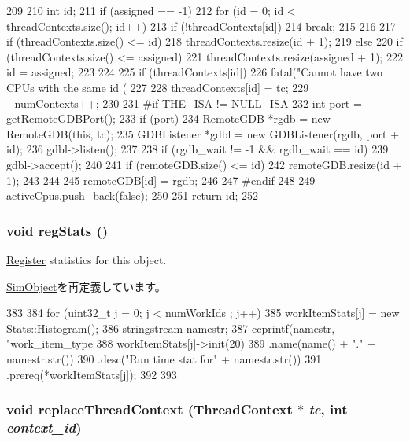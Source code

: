 \begin{DoxyCode}
209 {
210     int id;
211     if (assigned == -1) {
212         for (id = 0; id < threadContexts.size(); id++) {
213             if (!threadContexts[id])
214                 break;
215         }
216 
217         if (threadContexts.size() <= id)
218             threadContexts.resize(id + 1);
219     } else {
220         if (threadContexts.size() <= assigned)
221             threadContexts.resize(assigned + 1);
222         id = assigned;
223     }
224 
225     if (threadContexts[id])
226         fatal("Cannot have two CPUs with the same id (%
227 
228     threadContexts[id] = tc;
229     _numContexts++;
230 
231 #if THE_ISA != NULL_ISA
232     int port = getRemoteGDBPort();
233     if (port) {
234         RemoteGDB *rgdb = new RemoteGDB(this, tc);
235         GDBListener *gdbl = new GDBListener(rgdb, port + id);
236         gdbl->listen();
237 
238         if (rgdb_wait != -1 && rgdb_wait == id)
239             gdbl->accept();
240 
241         if (remoteGDB.size() <= id) {
242             remoteGDB.resize(id + 1);
243         }
244 
245         remoteGDB[id] = rgdb;
246     }
247 #endif
248 
249     activeCpus.push_back(false);
250 
251     return id;
252 }
\end{DoxyCode}
\hypertarget{classSystem_a4dc637449366fcdfc4e764cdf12d9b11}{
\subsubsection[{regStats}]{\setlength{\rightskip}{0pt plus 5cm}void regStats ()}}
\label{classSystem_a4dc637449366fcdfc4e764cdf12d9b11}
\hyperlink{classRegister}{Register} statistics for this object. 

\hyperlink{classSimObject_a4dc637449366fcdfc4e764cdf12d9b11}{SimObject}を再定義しています。


\begin{DoxyCode}
383 {
384     for (uint32_t j = 0; j < numWorkIds ; j++) {
385         workItemStats[j] = new Stats::Histogram();
386         stringstream namestr;
387         ccprintf(namestr, "work_item_type%
388         workItemStats[j]->init(20)
389                          .name(name() + "." + namestr.str())
390                          .desc("Run time stat for" + namestr.str())
391                          .prereq(*workItemStats[j]);
392     }
393 }
\end{DoxyCode}
\hypertarget{classSystem_ab2e74da826f1a39705880c80002f52fd}{
\subsubsection[{replaceThreadContext}]{\setlength{\rightskip}{0pt plus 5cm}void replaceThreadContext ({\bf ThreadContext} $\ast$ {\em tc}, \/  int {\em context\_\-id})}}
\label{classSystem_ab2e74da826f1a39705880c80002f52fd}



